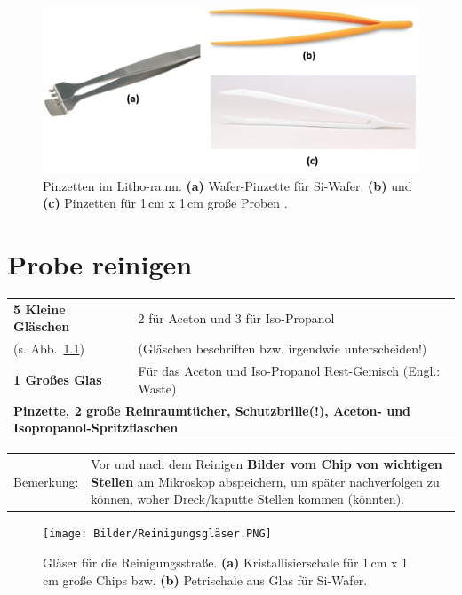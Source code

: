 \documentclass[
  ngerman,
  twoside,
  captions=tableheading,
  BCOR=.5cm,
  fontsize=11,
  ]{scrreprt}
\begin{document}
\begin{figure}[h]
\centering
\includegraphics[scale=0.5]{Bilder/Pinzetten_combined.PNG}
\caption{Pinzetten im Litho-raum. \textbf{(a)} Wafer-Pinzette für Si-Wafer. \textbf{(b)} und \textbf{(c)} Pinzetten für 1\,cm x 1\,cm große Proben \cite{Kristallierschale, Petrischale}.}\label{Pinzetten}
\end{figure}

\newpage

\chapter{Probe reinigen}
\begin{center}
\begin{tabular}{| p{5cm} | p{10cm} |} \hline
\textbf{5 Kleine Gläschen}  & 2 für Aceton und 3 für Iso-Propanol\\
(s. Abb.~\ref{Reinigungsgläser}) & (Gläschen beschriften bzw. irgendwie unterscheiden!)\\ \hline
\textbf{1 Großes Glas} & Für das Aceton und Iso-Propanol Rest-Gemisch (Engl.: Waste)\\ \hline
\multicolumn{2}{|p{15cm}|}{\textbf{Pinzette, 2 große Reinraumtücher, Schutzbrille(!), Aceton- und Isopropanol-Spritzflaschen}} \\ \hline
\end{tabular}
\end{center}

\begin{tabular}{l p{14cm}}
\underline{Bemerkung:} & Vor und nach dem Reinigen \textbf{Bilder vom Chip von wichtigen Stellen} am Mikroskop abspeichern, um später nachverfolgen zu können, woher Dreck/kaputte Stellen kommen (könnten).
\end{tabular}

\begin{figure}[h]
\centering
\texttt{[image: Bilder/Reinigungsgläser.PNG]}
\caption{Gläser für die Reinigungsstraße. \textbf{(a)} Kristallisierschale für 1\,cm x 1\,cm große Chips bzw. \textbf{(b)} Petrischale aus Glas für Si-Wafer.}\label{Reinigungsgläser}
\end{figure}
\end{document}
